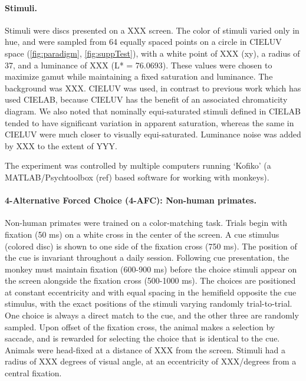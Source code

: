 \paragraph{Stimuli.} 
Stimuli were discs presented on a XXX screen.
The color of stimuli varied only in hue, and were sampled from 64 equally spaced points on a circle in CIELUV space (\autoref*{fig:paradigm}, \autoref*{fig:suppTest}), with a white point of XXX (xy), a radius of 37, and a luminance of XXX (L* = 76.0693). These values were chosen to maximize gamut while maintaining a fixed saturation and luminance. The background was XXX.
CIELUV was used, in contrast to previous work which has used CIELAB, because CIELUV has the benefit of an associated chromaticity diagram. 
We also noted that nominally equi-saturated stimuli defined in CIELAB tended to have significant variation in apparent saturation, whereas the same in CIELUV were much closer to visually equi-saturated. 
Luminance noise was added by XXX to the extent of YYY.


The experiment was controlled by multiple computers running `Kofiko' (a MATLAB/Psychtoolbox (ref) based software for working with monkeys).

\paragraph{4-Alternative Forced Choice (4-AFC): Non-human primates.} Non-human primates were trained on a color-matching task. Trials begin with fixation (50 ms) on a white cross in the center of the screen. A cue stimulus (colored disc) is shown to one side of the fixation cross (750 ms). The position of the cue is invariant throughout a daily session. Following cue presentation, the monkey must maintain fixation (600-900 ms) before the choice stimuli appear on the screen alongside the fixation cross (500-1000 ms). The choices are positioned at constant eccentricity and with equal spacing in the hemifield opposite the cue stimulus, with the exact positions of the stimuli varying randomly trial-to-trial. One choice is always a direct match to the cue, and the other three are randomly sampled. Upon offset of the fixation cross, the animal makes a selection by saccade, and is rewarded for selecting the choice that is identical to the cue. Animals were head-fixed at a distance of XXX from the screen. Stimuli had a radius of XXX degrees of visual angle, at an eccentricity of XXX/degrees from a central fixation.

